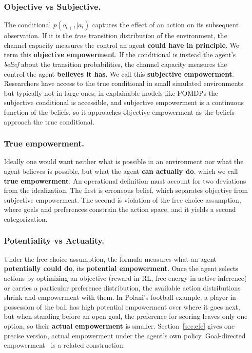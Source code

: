 \documentclass[letterpaper]{article} %
\theoremstyle{definition}
\begin{document}
\subsubsection{Objective vs Subjective.} The conditional $p(o_{t+1}|a_t)$ captures the effect of an action on its subsequent observation. If it is the \emph{true} transition distribution of the environment, the channel capacity measures the control an agent \textbf{could have in principle}. We term this \textbf{objective empowerment}. If the conditional is instead the agent's \emph{belief} about the transition probabilities, the channel capacity measures the control the agent \textbf{believes it has}. We call this \textbf{subjective empowerment}. Researchers have access to the true conditional in small simulated environments but typically not in large ones; in explainable models like POMDPs the subjective conditional is accessible, and subjective empowerment is a continuous function of the beliefs, so it approaches objective empowerment as the beliefs approach the true conditional.

\subsubsection{True empowerment.} Ideally one would want neither what is possible in an environment nor what the agent believes is possible, but what the agent \textbf{can actually do}, which we call \textbf{true empowerment}. An operational definition must account for two deviations from the idealization. The first is erroneous belief, which separates objective from subjective empowerment. The second is violation of the free choice assumption, where goals and preferences constrain the action space, and it yields a second categorization.

\subsubsection{Potentiality vs Actuality.} Under the free-choice assumption, the formula measures what an agent \textbf{potentially could do}, its \textbf{potential empowerment}. Once the agent selects actions by optimizing an objective (reward in RL, free energy in active inference) or carries a particular preference distribution, the available action distributions shrink and empowerment with them. In Polani's football example, a player in possession of the ball has high potential empowerment over where it goes next, but when standing before an open goal, the preference for scoring leaves only one option, so their \textbf{actual empowerment} is smaller. Section~\ref{sec:efe} gives one precise version, actual empowerment under the agent's own policy. Goal-directed empowerment~\citep{goalDirectedEmpowerment} is a related construction.
\end{document}
